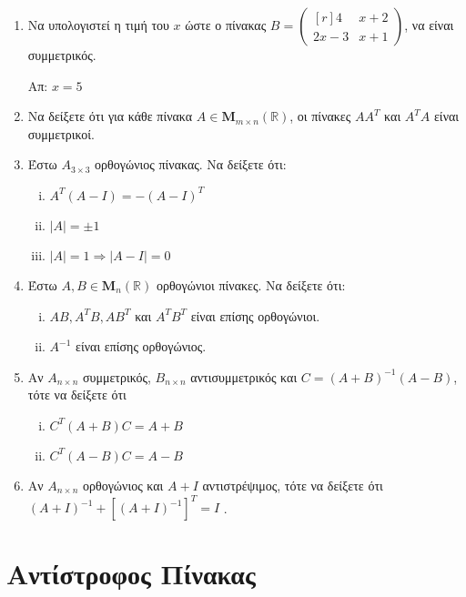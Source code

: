 \begin{enumerate}
  \item Να υπολογιστεί η τιμή του $x$ ώστε ο πίνακας $ B = 
    \begin{pmatrix*}[r]
      4 & x+2 \\
      2x-3 & x+1 
    \end{pmatrix*} $, να είναι συμμετρικός. 

    \hfill Απ: $x=5$  
  \item Να δείξετε ότι για κάθε πίνακα $ A \in \textbf{M}_{m \times n}(\mathbb{R}) $, 
    οι πίνακες $ AA^{T} $ και $ A^{T}A $ είναι συμμετρικοί.

  \item Έστω $ A_{3\times 3} $ ορθογώνιος πίνακας. Να δείξετε ότι:
    \begin{enumerate}[i)]
      \item $ A^{T}(A-I) = -(A-I)^{T} $
      \item $ |A|=\pm 1 $
      \item $ |A|=1 \Rightarrow |A-I|=0 $
    \end{enumerate}

  \item Έστω $ A,B \in \textbf{M}_{n}(\mathbb{R}) $ ορθογώνιοι πίνακες. Να δείξετε ότι: 
    \begin{enumerate}[i)]
      \item $ AB, A^{T}B, AB^{T} $ και $ A^{T}B^{T} $ είναι επίσης ορθογώνιοι.
      \item $ A^{-1} $ είναι επίσης ορθογώνιος.
    \end{enumerate}

  \item Αν $A_{n\times n}$ συμμετρικός, $B_{n\times n}$ αντισυμμετρικός και 
    $C =(A+B)^{-1}(A-B) $, τότε να δείξετε ότι 
    \begin{enumerate}[i)]
      \item $C^{T}(A+B)C=A+B $
      \item $ C^{T}(A-B)C=A-B $
    \end{enumerate}

  \item Αν $A_{n\times n}$ ορθογώνιος και $ A+I $ αντιστρέψιμος, τότε να δείξετε ότι 
    $ (A+I)^{-1} + [(A+I)^{-1}]^{T} = I $ .
\end{enumerate}


\section*{Αντίστροφος Πίνακας}



